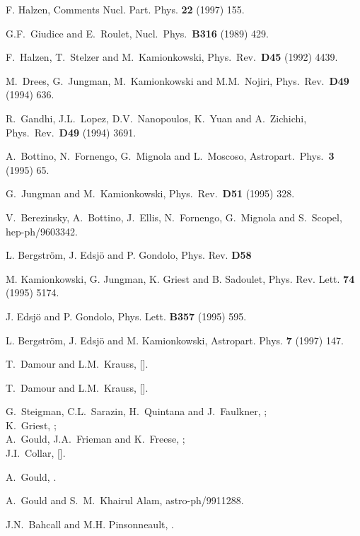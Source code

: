 \begin{thebibliography}{99}
 F. Halzen, Comments Nucl. Part. Phys. {\bf 22} (1997) 155.


G.F.~Giudice and E.~Roulet, Nucl.\ Phys.\ {\bf B316} (1989) 429.

F.~Halzen, T.~Stelzer and M.~Kamionkowski, Phys.\ Rev.\ {\bf D45} (1992) 4439.

M.~Drees, G.~Jungman, M.~Kamionkowski and M.M.~Nojiri, Phys.\ Rev.\ {\bf D49}
(1994) 636.

R.~Gandhi, J.L.~Lopez, D.V.~Nanopoulos, K.~Yuan and A.~Zichichi,
Phys.\ Rev.\ {\bf D49} (1994) 3691.

A.~Bottino, N.~Fornengo, G.~Mignola and L.~Moscoso, Astropart.\ Phys.\
{\bf 3} (1995) 65.

G.~Jungman and M.~Kamionkowski, Phys.\ Rev.\ {\bf D51} (1995) 328.

V.~Berezinsky, A.~Bottino, J.~Ellis, N.~Fornengo, G.~Mignola and
S.~Scopel, hep-ph/9603342.

L. Bergstr\"om, J. Edsj\"o and P. Gondolo, Phys. Rev.
{\bf D58}

 M. Kamionkowski, G. Jungman, K. Griest and
B. Sadoulet, Phys. Rev. Lett. {\bf 74} (1995) 5174.

 J. Edsj\"o and P. Gondolo, Phys. Lett. {\bf B357} (1995) 595.

 L. Bergstr\"om, J. Edsj\"o and M. Kamionkowski, Astropart.
Phys. {\bf 7} (1997) 147.

T.~Damour and L.M.~Krauss,   [].

T.~Damour and L.M.~Krauss,   [].

G.~Steigman, C.L.~Sarazin, H.~Quintana and J.~Faulkner, ;\\
K.~Griest, \prd{37}{1988}{2703};\\
A.~Gould, J.A.~Frieman and K.~Freese, ;\\
J.I.~Collar,  [].

A.~Gould, .

A.~Gould and S.~M.~Khairul Alam,
astro-ph/9911288.

J.N.~Bahcall and M.H. Pinsonneault,
.



\end{thebibliography}
